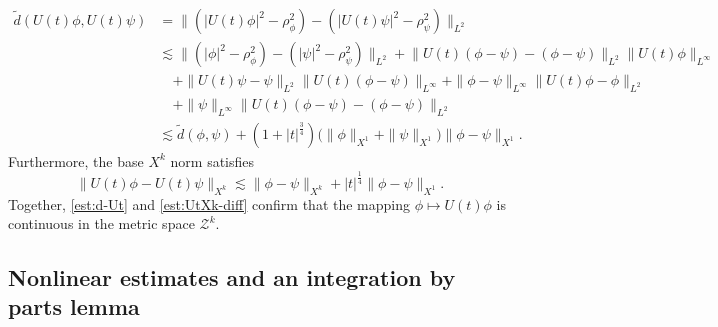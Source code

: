 \documentclass{amsart}
\numberwithin{equation}{section}
\begin{document}
\begin{equation}\label{est:d-Ut}
\begin{aligned}
\widetilde{d}(U(t)\phi, U(t)\psi)
&={}\big\| (|U(t)\phi|^2-\rho_\phi^2)-(|U(t)\psi|^2-\rho_\psi^2) \big\|_{L^2} \\
&\lesssim 
\big\| (|\phi|^2-\rho_\phi^2)-(|\psi|^2-\rho_\psi^2)\big\|_{L^2}  
+\big\| U(t)(\phi-\psi)-(\phi-\psi)\big\|_{L^2} \| U(t)\phi \|_{L^\infty} \\
&\quad +\| U(t)\psi -\psi\|_{L^2}\| U(t)(\phi-\psi)\|_{L^\infty} 
+\| \phi-\psi\|_{L^\infty}\| U(t)\phi-\phi\|_{L^2} \\
&\quad +\| \psi\|_{L^\infty}\big\| U(t)(\phi-\psi)-(\phi-\psi)\big\|_{L^2} \\
&\lesssim \widetilde{d}(\phi, \psi) +(1+|t|^{\frac34})\big( \| \phi\|_{X^1}+\| \psi\|_{X^1}\big)\|\phi -\psi\|_{X^1}.
\end{aligned}
\end{equation}
Furthermore, the base $X^k$ norm satisfies
\begin{equation}\label{est:UtXk-diff}
    \| U(t)\phi-U(t)\psi\|_{X^k}\lesssim \| \phi-\psi\|_{X^k}+|t|^{\frac14}\| \phi-\psi\|_{X^1}. 
\end{equation}
Together, \eqref{est:d-Ut} and \eqref{est:UtXk-diff} confirm that the mapping $\phi\mapsto U(t)\phi$ is continuous in the metric space $\mathcal{Z}^k$.




\subsection{Nonlinear estimates and an integration by parts lemma}
\end{document}
